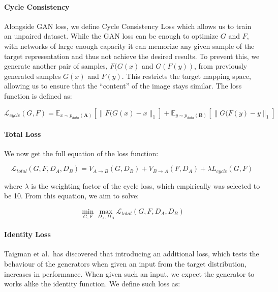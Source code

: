 \documentclass[]{report}
\begin{document}
\paragraph{Cycle Consistency}

Alongside GAN loss, we define Cycle Consistency Loss which allows us to
train an unpaired dataset. While the GAN loss can be enough to optimize
\(G\) and \(F\), with networks of large enough capacity it can memorize
any given sample of the target representation and thus not achieve the
desired results. To prevent this, we generate another pair of samples,
\(F(G(x)\) and \(G(F(y))\), from previously generated samples \(G(x)\)
and \(F(y)\). This restricts the target mapping space, allowing us to
ensure that the ``content'' of the image stays similar. The loss
function is defined as:

\begin{equation}
    \mathcal{L}_{cycle}(G, F) = \mathbb{E}_{x \sim p_{data}(\mathbf{A})}[\|F(G(x) - x\|_1] + \mathbb{E}_{y \sim p_{data}(\mathbf{B})}[\|G(F(y) - y\|_1]
\end{equation}

\paragraph{Total Loss}

We now get the full equation of the loss function:

\begin{equation}
    \mathcal{L}_{total}(G, F, D_A, D_B) = V_{A \rightarrow B}(G, D_B) + V_{B \rightarrow A}(F, D_A) + \lambda L_{cycle}(G, F) \label{eq:cyclegan_total}
\end{equation}

where \(\lambda\) is the weighting factor of the cycle loss, which
empirically was selected to be 10. From this equation, we aim to solve:

\begin{equation}
    \min_{G, F} \max_{D_A, D_B} \mathcal{L}_{total}(G, F, D_A, D_B)
\end{equation}

\paragraph{Identity Loss \label{identity-loss}}

Taigman et al.~has discovered that introducing an additional loss, which
tests the behaviour of the generators when given an input from the
target distribution, increases in performance. When given such an input,
we expect the generator to works alike the identity function. We define
such loss as:
\end{document}
